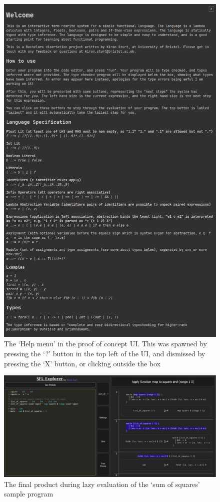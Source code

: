 \begin{figure}[h]
    \centering
    \includegraphics[width=0.9\linewidth]{images/testathon_help_menu_cropped.png} 
    \captionsetup{justification=centering}
    \caption{The `Help menu' in the proof of concept UI. This was spawned by pressing the `?' button in the top left of the UI, and dismissed by pressing the `X' button, or clicking outside the box}
    \label{fig:screenshot_phase2_help}
\end{figure}

\begin{figure}[h]
    \centering
    \includegraphics[width=\linewidth]{images/final_dark.png} 
    \captionsetup{justification=centering}
    \caption{The final product during lazy evaluation of the `sum of squares' sample program}
    \label{fig:screenshot_final_dark}
\end{figure}

